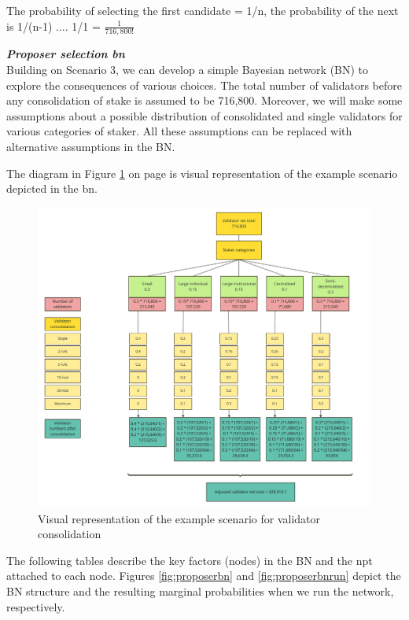 The probability of selecting the first candidate = 1/n, the probability of the next is 1/(n-1) .... 1/1 = $ \frac{1}{716,800!}$

\noindent
\textbf{\textit{Proposer selection \gls{bn}}} \\
\noindent
Building on Scenario 3, we can develop a simple Bayesian network (BN)  to explore the consequences of various choices. The total number of validators before any consolidation of stake is assumed to be 716,800.  Moreover, we will make some assumptions about a possible distribution of consolidated and single validators for various categories of staker. All these assumptions can be replaced with alternative assumptions in the BN. 

The diagram in Figure \ref{fig:proposer} on page \pageref{fig:proposer} is visual representation of the example scenario depicted in the \gls{bn}.

\begin{figure}[htbp]
\begin{center}
\includegraphics[width=\linewidth]{images/proposer-selection-diagram.pdf}
\caption{Visual representation of the example scenario for validator consolidation}
\label{fig:proposer}
\end{center}
\end{figure}


The following tables describe the key factors (nodes) in the BN and the \gls{npt} attached to each node. Figures \ref{fig:proposerbn} and \ref{fig:proposerbnrun} depict the BN structure and the resulting marginal probabilities when we run the network, respectively.
 
